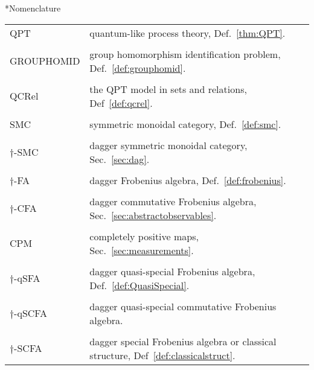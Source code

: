 \begin{chapter}*{Nomenclature}

\begin{tabular}{ll}
QPT & quantum-like process theory, Def.~\ref{thm:QPT}. \\\\
GROUPHOMID & group homomorphism identification problem, Def.~\ref{def:grouphomid}. \\\\
QCRel & the QPT model in sets and relations, Def~\ref{def:qcrel}. \\\\
SMC & symmetric monoidal category, Def.~\ref{def:smc}. \\\\
$\dagger$-SMC & dagger symmetric monoidal category, Sec.~\ref{sec:dag}. \\\\
$\dagger$-FA & dagger Frobenius algebra, Def.~\ref{def:frobenius}. \\\\
$\dagger$-CFA & dagger commutative Frobenius algebra, Sec.~\ref{sec:abstractobservables}. \\\\
CPM & completely positive maps, Sec.~\ref{sec:measurements}. \\\\
$\dagger$-qSFA & dagger quasi-special Frobenius algebra, Def.~\ref{def:QuasiSpecial}. \\\\
$\dagger$-qSCFA & dagger quasi-special commutative Frobenius algebra. \\\\
$\dagger$-SCFA & dagger special Frobenius algebra or classical structure, Def~\ref{def:classicalstruct}.
\end{tabular}

\end{chapter}
